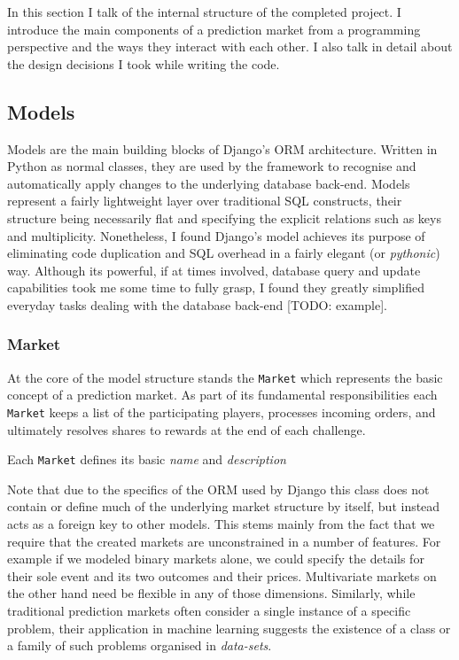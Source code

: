 \documentclass[bsc,frontabs,twoside,singlespacing,parskip,deptreport]{infthesis}     %
\begin{document}
In this section I talk of the internal structure of the completed project. I introduce the main components of a prediction market from a programming perspective and the ways they interact with each other. I also talk in detail about the design decisions I took while writing the code.

\subsection{Models}
    Models are the main building blocks of Django's ORM architecture. Written in Python as normal classes, they are used by the framework to recognise and automatically apply changes to the underlying database back-end. Models represent a fairly lightweight layer over traditional SQL constructs, their structure being necessarily flat and specifying the explicit relations such as keys and multiplicity. Nonetheless, I found Django’s model achieves its purpose of eliminating code duplication and SQL overhead in a fairly elegant (or {\em pythonic}) way. Although its powerful, if at times involved, database query and update capabilities took me some time to fully grasp, I found they greatly simplified everyday tasks dealing with the database back-end [TODO: example]. 

\subsubsection{Market}

	At the core of the model structure stands the {\tt Market} which represents the basic concept of a prediction market. As part of its fundamental responsibilities each {\tt Market} keeps a list of the participating players, processes incoming orders, and ultimately resolves shares to rewards at the end of each challenge. 

	Each {\tt Market} defines its basic {\em name} and {\em description} 

	Note that due to the specifics of the ORM used by Django this class does not contain or define much of the underlying market structure by itself, but instead acts as a foreign key to other models. This stems mainly from the fact that we require that the created markets are unconstrained in a number of features. For example if we modeled binary markets alone, we could specify the details for their sole event and its two outcomes and their prices. Multivariate markets on the other hand need be flexible in any of those dimensions. Similarly, while traditional prediction markets often consider a single instance of a specific problem, their application in machine learning suggests the existence of a class or a family of such problems organised in {\em data-sets}. 
	
\end{document}
